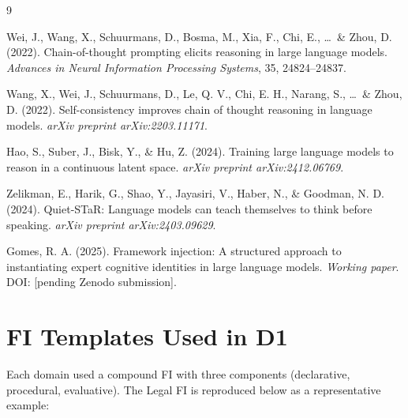 \documentclass[11pt,a4paper]{article}
\begin{document}

\begin{thebibliography}{9}

Wei, J., Wang, X., Schuurmans, D., Bosma, M., Xia, F., Chi, E., \ldots\
\& Zhou, D. (2022).
\newblock Chain-of-thought prompting elicits reasoning in large language models.
\newblock \textit{Advances in Neural Information Processing Systems}, 35, 24824--24837.

Wang, X., Wei, J., Schuurmans, D., Le, Q. V., Chi, E. H., Narang, S., \ldots\
\& Zhou, D. (2022).
\newblock Self-consistency improves chain of thought reasoning in language models.
\newblock \textit{arXiv preprint arXiv:2203.11171}.

Hao, S., Suber, J., Bisk, Y., \& Hu, Z. (2024).
\newblock Training large language models to reason in a continuous latent space.
\newblock \textit{arXiv preprint arXiv:2412.06769}.

Zelikman, E., Harik, G., Shao, Y., Jayasiri, V., Haber, N., \& Goodman, N. D. (2024).
\newblock Quiet-STaR: Language models can teach themselves to think before speaking.
\newblock \textit{arXiv preprint arXiv:2403.09629}.

Gomes, R. A. (2025).
\newblock Framework injection: A structured approach to instantiating expert
cognitive identities in large language models.
\newblock \textit{Working paper}. DOI: [pending Zenodo submission].

\end{thebibliography}

\appendix

\section{FI Templates Used in D1}
\label{app:fi}

Each domain used a compound FI with three components (declarative, procedural,
evaluative). The Legal FI is reproduced below as a representative example:
\end{document}

